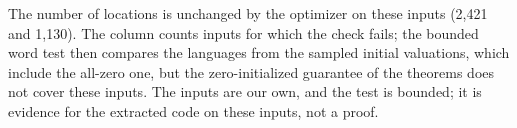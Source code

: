 The number of locations is unchanged by the optimizer on these inputs (2{,}421 and 1{,}130). The  column counts inputs for which the check fails; the bounded word test then compares the languages from the sampled initial valuations, which include the all-zero one, but the zero-initialized guarantee of the theorems does not cover these inputs. The inputs are our own, and the test is bounded; it is evidence for the extracted code on these inputs, not a proof.
